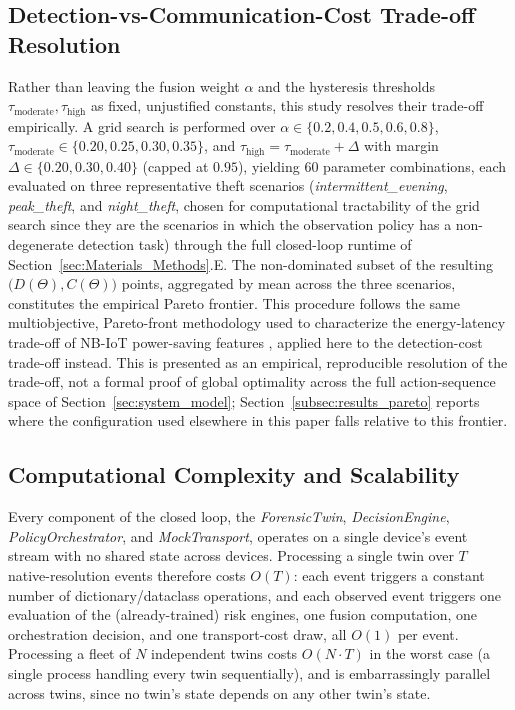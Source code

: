 \documentclass{ieeeaccess}
\begin{document}
\subsection{Detection-vs-Communication-Cost Trade-off Resolution}
\label{subsec:pareto}
Rather than leaving the fusion weight $\alpha$ and the hysteresis thresholds $\tau_{\text{moderate}}, \tau_{\text{high}}$ as fixed, unjustified constants, this study resolves their trade-off empirically. A grid search is performed over $\alpha \in \{0.2, 0.4, 0.5, 0.6, 0.8\}$, $\tau_{\text{moderate}} \in \{0.20, 0.25, 0.30, 0.35\}$, and $\tau_{\text{high}} = \tau_{\text{moderate}} + \Delta$ with margin $\Delta \in \{0.20, 0.30, 0.40\}$ (capped at $0.95$), yielding 60 parameter combinations, each evaluated on three representative theft scenarios (\textit{intermittent\_evening}, \textit{peak\_theft}, and \textit{night\_theft}, chosen for computational tractability of the grid search since they are the scenarios in which the observation policy has a non-degenerate detection task) through the full closed-loop runtime of Section~\ref{sec:Materials_Methods}.E. The non-dominated subset of the resulting $\big(D(\Theta), C(\Theta)\big)$ points, aggregated by mean across the three scenarios, constitutes the empirical Pareto frontier. This procedure follows the same multiobjective, Pareto-front methodology used to characterize the energy-latency trade-off of NB-IoT power-saving features \cite{b35}, applied here to the detection-cost trade-off instead. This is presented as an empirical, reproducible resolution of the trade-off, not a formal proof of global optimality across the full action-sequence space of Section~\ref{sec:system_model}; Section~\ref{subsec:results_pareto} reports where the configuration used elsewhere in this paper falls relative to this frontier.

\subsection{Computational Complexity and Scalability}
\label{subsec:complexity}
Every component of the closed loop, the \textit{ForensicTwin}, \textit{DecisionEngine}, \textit{PolicyOrchestrator}, and \textit{MockTransport}, operates on a single device's event stream with no shared state across devices. Processing a single twin over $T$ native-resolution events therefore costs $O(T)$: each event triggers a constant number of dictionary/dataclass operations, and each observed event triggers one evaluation of the (already-trained) risk engines, one fusion computation, one orchestration decision, and one transport-cost draw, all $O(1)$ per event. Processing a fleet of $N$ independent twins costs $O(N \cdot T)$ in the worst case (a single process handling every twin sequentially), and is embarrassingly parallel across twins, since no twin's state depends on any other twin's state.
\end{document}
